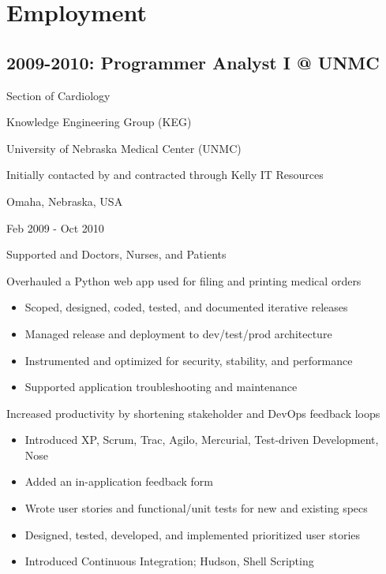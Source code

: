 \documentclass[letter,,openany,oneside,english]{sphinxhowto}
\begin{document}
\section{Employment}
\label{\detokenize{resume:employment}}

\subsection{2009-2010: Programmer Analyst I @ UNMC}
\label{\detokenize{resume:programmer-analyst-i-unmc}}
\begin{DUlineblock}{0em}
\item[] Section of Cardiology
\item[] Knowledge Engineering Group (KEG)
\item[] University of Nebraska Medical Center (UNMC)
\item[] Initially contacted by and contracted through Kelly IT Resources
\item[] Omaha, Nebraska, USA
\item[] Feb 2009 - Oct 2010
\item[] 
\end{DUlineblock}

Supported 
and 
Doctors, Nurses, and Patients

Overhauled a Python web app used for filing and printing medical orders
\begin{itemize}
\item {} 
Scoped, designed, coded, tested, and documented iterative releases

\item {} 
Managed release and deployment to dev/test/prod architecture

\item {} 
Instrumented and optimized for security, stability, and performance

\item {} 
Supported application troubleshooting and maintenance

\end{itemize}

Increased productivity by shortening stakeholder and DevOps feedback loops
\begin{itemize}
\item {} 
Introduced XP, Scrum, Trac, Agilo, Mercurial, Test-driven Development, Nose

\item {} 
Added an in-application feedback form

\item {} 
Wrote user stories and functional/unit tests for new and existing specs

\item {} 
Designed, tested, developed, and implemented prioritized user stories

\item {} 
Introduced Continuous Integration; Hudson, Shell Scripting

\end{itemize}
\end{document}
